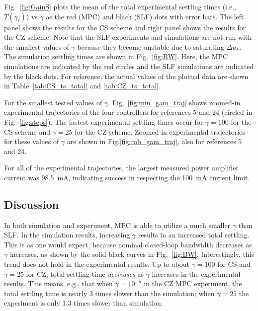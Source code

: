 \documentclass[twocolumn,twoside]{IEEEtran}
\begin{document}
Fig.~\ref{fig:GainS} plots the mean of the total experimental settling times (i.e., $\bar{T}(\gamma_{\ell})$) vs $\gamma$ as the red (MPC) and black (SLF) dots with error bars. The left panel shows the results for the CS scheme and right panel shows the results for the CZ scheme. Note that the SLF experiments and simulations are not run with the smallest values of $\gamma$ because they become unstable due to saturating $\Delta u_k$.
The simulation settling times are shown in Fig.~\ref{fig:BW}. Here, the MPC simulations are indicated by the red circles and the SLF simulations are indicated by the black dots.
For reference, the actual values of the plotted data are shown in Table~\ref{tab:CS_ts_total} and \ref{tab:CZ_ts_total}. 

For the smallest tested values of $\gamma$, Fig.~\ref{fig:min_gam_traj} shows zoomed-in experimental trajectories of the four controllers for references 5 and 24 (circled in Fig.~\ref{fig:steps}). The fastest experimental settling times occur for $\gamma=100$ for the CS scheme and $\gamma=25$ for the CZ scheme. Zoomed-in experimental trajectories for these values of $\gamma$ are shown in Fig.\ref{fig:rob_gam_traj}, also for references 5 and 24.

For all of the experimental trajectories, the largest measured power amplifier current was 98.5~mA, indicating success in respecting the 100~mA current limit.

\subsection{Discussion}\label{sec:res_disc}
In both simulation and experiment, MPC is able to utilize a much smaller $\gamma$ than SLF. In the simulation results, increasing $\gamma$ results in an increased total settling. This is as one would expect, because nominal closed-loop bandwidth decreases as $\gamma$ increases, as shown by the solid black curves in Fig.~\ref{fig:BW}. Interestingly, this trend does not hold in the experimental results. Up to about ${\gamma=100}$ for CS and ${\gamma=25}$ for CZ, total settling time \emph{decreases} as $\gamma$ increases in the experimental results. This means, e.g., that when ${\gamma=10^{-5}}$ in the CZ MPC experiment, the total settling time is nearly 3 times slower than the simulation; when ${\gamma=25}$ the experiment is only 1.3 times slower than simulation.
\end{document}
